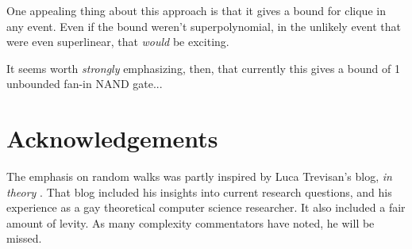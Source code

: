 \documentclass[12pt]{article}
\theoremstyle{definition}
\begin{document}
One appealing thing about this approach is that it gives a
bound for clique in any event. Even if the bound weren't
superpolynomial, in the unlikely event that were even superlinear,
that {\em would} be exciting.

It seems worth {\em strongly} emphasizing, then, that currently this gives a bound
of 1 unbounded fan-in NAND gate...

\section{Acknowledgements}

The emphasis on random walks was partly inspired by Luca Trevisan's
blog, {\em in theory} \cite{luca_trevisan_blog_random_walks_1}.
That blog included his insights into current research questions, and
his experience as a gay theoretical computer science researcher.
It also included a fair amount of levity.
As many complexity commentators have noted, he will be missed.



\end{document}
